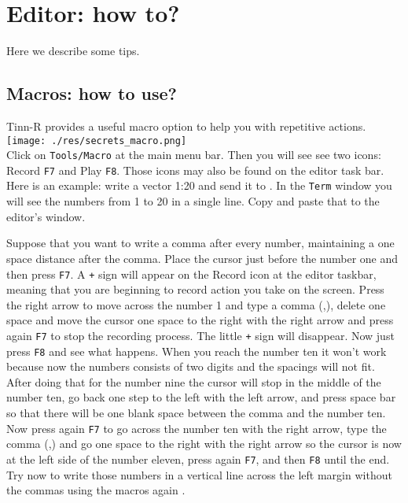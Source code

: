 
\section{Editor: how to?}

Here we describe some tips.

\subsection{Macros: how to use?}

Tinn-R provides a useful macro option to help you with repetitive actions.\\

\texttt{[image: ./res/secrets\_macro.png]}\\

Click on \texttt{Tools/Macro} at the main menu bar. Then you will see see two icons: Record \texttt{F7} and Play \texttt{F8}.
Those icons may also be found on the editor task bar. Here is an example: write a vector 1:20 and send it to \RR{}.
In the \texttt{Term} window you will see the numbers from 1 to 20 in a single line. Copy and paste that to the editor's window.

Suppose that you want to write a comma after every number, maintaining a one space distance after the comma.
Place the cursor just before the number one and then press \texttt{F7}.
A \texttt{+} sign will appear on the Record icon at the editor taskbar, meaning that you are beginning to record action
you take on the screen. Press the right arrow to move across the number 1 and type a comma (,),
delete one space and move the cursor one space to the right with the right arrow and press again
\texttt{F7} to stop the recording process. The little \texttt{+} sign will disappear.
Now just press \texttt{F8} and see what happens. When you reach the number ten it won't work because now the numbers
consists of two digits and the spacings will not fit.
After doing that for the number nine the cursor will stop in the middle of the number ten,
go back one step to the left with the left arrow, and press space bar so that there will be one blank space
between the comma and the number ten. Now press again \texttt{F7} to go across the number ten with the right arrow,
type the comma (,) and go one space to the right with the right arrow so the cursor is now at the left side of
the number eleven, press again \texttt{F7}, and then \texttt{F8} until the end.
Try now to write those numbers in a vertical line across the left margin without the commas using the macros again .


